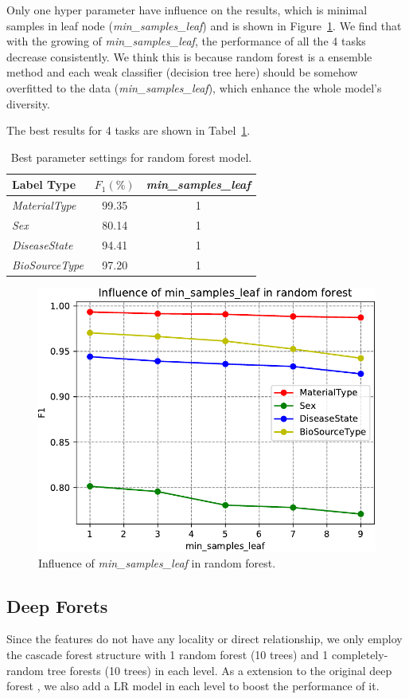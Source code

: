 \documentclass[sigconf]{acmart}
\begin{document}
	Only one hyper parameter have influence on the results, which is minimal samples in leaf node (\textit{min\_samples\_leaf}) and is shown in Figure~\ref{fig:min_samples_leaf}. We find that with the growing of \textit{min\_samples\_leaf}, the performance of all the 4 tasks decrease consistently. We think this is because random forest is a ensemble method and each weak classifier (decision tree here) should be somehow overfitted to the data (\textit{min\_samples\_leaf}), which enhance the whole model's diversity.
	
	The best results for 4 tasks are shown in Tabel~\ref{tab:RF}.
	\begin{table}[tbp]
		\centering
		\begin{tabular}{l|cc}
			\toprule
			{Label Type} & $F_1 (\%)$& \textit{min\_samples\_leaf}  \\
			\midrule
			{\textit{MaterialType}}&99.35 &1\\
			{\textit{Sex}}		& 80.14  &1\\
			{\textit{DiseaseState}}& 94.41&1 \\
			{\textit{BioSourceType}}& 97.20 &1\\
			\bottomrule	
		\end{tabular}
		\caption{Best parameter settings for random forest model. }
		\label{tab:RF}
	\end{table}
	 
	
\begin{figure}[h]
\centering
\includegraphics[width=0.8\linewidth]{../figs/min_samples_leaf}
\caption{Influence of \textit{min\_samples\_leaf} in random forest.}
\label{fig:min_samples_leaf}
\end{figure}
	

\subsection{Deep Forets}
Since the features do not have any locality or direct relationship, we only employ the cascade forest structure with 1 random forest (10 trees) and 1 completely-random tree forests (10 trees) in each level. As a extension to the original deep forest \cite{zhou2017deep}, we also add a LR model in each level to boost the performance of it. 
\end{document}
